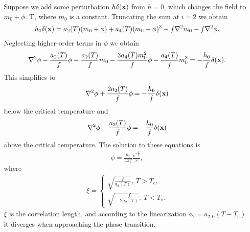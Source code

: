 Suppose we add some perturbation $h\delta(\vb{x})$ from $h = 0$, which changes the field to $m_{0} + \phi$. T, where $m_{0}$ is a constant. Truncating the sum at $i = 2$ we obtain
\begin{align*}
	h_{0}\delta(\vb{x}) = a_{2}(T)(m_{0} + \phi) + a_{4}(T)(m_{0} + \phi)^{3} - f\laplacian{m_{0}} - f\laplacian{\phi}.
\end{align*}
Neglecting higher-order terms in $\phi$ we obtain
\begin{align*}
	\laplacian{\phi} - \frac{a_{2}(T)}{f}\phi - \frac{a_{2}(T)}{f}m_{0} - \frac{3a_{4}(T)m_{0}^{2}}{f}\phi - \frac{a_{4}(T)}{f}m_{0}^{3} = -\frac{h_{0}}{f}\delta(\vb{x}).
\end{align*}
This simplifies to
\begin{align*}
	\laplacian{\phi} + \frac{2a_{2}(T)}{f}\phi = -\frac{h_{0}}{f}\delta(\vb{x})
\end{align*}
below the critical temperature and
\begin{align*}
	\laplacian{\phi} - \frac{a_{2}(T)}{f}\phi = -\frac{h_{0}}{f}\delta(\vb{x})
\end{align*}
above the critical temperature. The solution to these equations is
\begin{align*}
	\phi = \frac{h_{0}}{4\pi f}\frac{e^{-\frac{r}{\xi}}}{r},
\end{align*}
where
\begin{align*}
	\xi =
	\begin{cases}
		\sqrt{\frac{f}{a_{2}(T)}},\ T > T_{\text{c}}, \\
		\sqrt{-\frac{f}{2a_{2}(T)}},\ T < T_{\text{c}}.
	\end{cases}
\end{align*}
$\xi$ is the correlation length, and according to the linearization $a_{2} = a_{2, 0}(T - T_{\text{c}})$ it diverges when approaching the phase transition.

